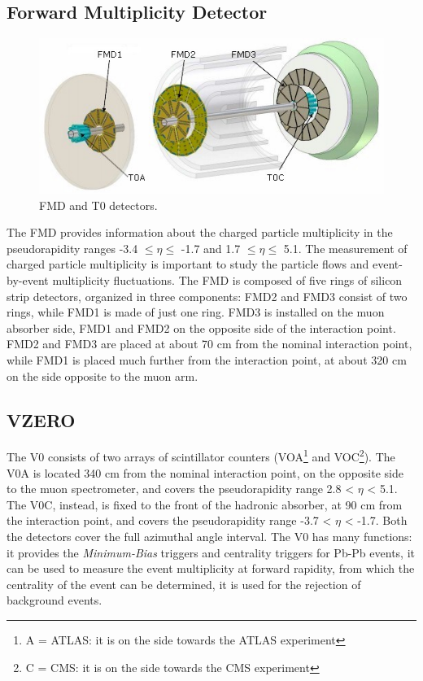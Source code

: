 \subsection*{Forward Multiplicity Detector}
\begin{figure}
  \centering
  \includegraphics[scale=0.50]{figures/FMD.jpg}
  \caption{FMD and T0 detectors.}
  \label{fig:FMD}
\end{figure}
%
The FMD provides information about the charged particle multiplicity in the pseudorapidity ranges -3.4 $\leq \eta \leq$ -1.7 and 1.7 $\leq \eta \leq$ 5.1. The measurement of charged particle multiplicity is important to study the particle flows and event-by-event multiplicity fluctuations. The FMD is composed of five rings of silicon strip detectors, organized in three components: FMD2 and FMD3 consist of two rings, while FMD1 is made of just one ring. FMD3 is installed on the muon absorber side, FMD1 and FMD2 on the opposite side of the interaction point. FMD2 and FMD3 are placed at about 70 cm from the nominal interaction point, while FMD1 is placed much further from the interaction point, at about 320 cm on the side opposite to the muon arm.
\subsection*{VZERO}
The V0 consists of two arrays of scintillator counters (VOA\footnote{A = ATLAS: it is on the side towards the ATLAS experiment} and VOC\footnote{C = CMS: it is on the side towards the CMS experiment}). The V0A is located 340 cm from the nominal interaction point, on the opposite side to the muon spectrometer, and covers the pseudorapidity range 2.8 < $\eta$ < 5.1. The V0C, instead, is fixed to the front of the hadronic absorber, at 90 cm from the interaction point, and covers the pseudorapidity range -3.7 < $\eta$ < -1.7. Both the detectors cover the full azimuthal angle interval. The V0 has many functions: it provides the \textit{Minimum-Bias} triggers and centrality triggers for Pb-Pb events, it can be used to measure the event multiplicity at forward rapidity, from which the centrality of the event can be determined, it is used for the rejection of background events.
